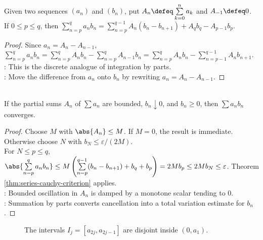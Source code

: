 \begin{theorem} \label{thm:summation-by-parts} \\
Given two sequences $(a_n)$ and $(b_n)$, put $A_n\defeq\sum\limits_{k=0}^{n}a_k$ and $A_{-1}\defeq0$.\\
If $0\leq p\leq q$, then $\sum\limits_{n=p}^{q}a_nb_n=\sum\limits_{n=p}^{q-1}A_n(b_n-b_{n+1})+A_qb_q-A_{p-1}b_p$.
\begin{proof}
Since $a_n=A_n-A_{n-1}$, $\sum\limits_{n=p}^{q}a_nb_n=\sum\limits_{n=p}^{q}A_nb_n-\sum\limits_{n=p}^{q}A_{n-1}b_n =\sum\limits_{n=p}^{q}A_nb_n-\sum\limits_{n=p-1}^{q-1}A_nb_{n+1}$.\\
: This is the discrete analogue of integration by parts.\\
: Move the difference from $a_n$ onto $b_n$ by rewriting $a_n=A_n-A_{n-1}$.
\end{proof}
\end{theorem}

\begin{theorem} \label{thm:dirichlet-test-series} \\
If the partial sums $A_n$ of $\sum a_n$ are bounded, $b_n\downarrow0$, and $b_n\geq0$, then $\sum a_nb_n$ converges.
\begin{proof}
Choose $M$ with $\abs{A_n}\leq M$. If $M=0$, the result is immediate. Otherwise choose $N$ with $b_N\leq\varepsilon/(2M)$.\\
For $N\leq p\leq q$, $\abs{\sum\limits_{n=p}^{q}a_nb_n}\leq M\left(\sum\limits_{n=p}^{q-1}(b_n-b_{n+1})+b_q+b_p\right)=2Mb_p\leq2Mb_N\leq\varepsilon$. Theorem \ref{thm:series-cauchy-criterion} applies.\\
: Bounded oscillation in $A_n$ is damped by a monotone scalar tending to $0$.\\
: Summation by parts converts cancellation into a total variation estimate for $b_n$.
\end{proof}
\end{theorem}

\begin{figure}[H]
  \centering
  
  \caption{The intervals $I_j=[a_{2j},a_{2j-1}]$ are disjoint inside $(0,a_1)$.}
  \label{fig:alternating-series-intervals}
\end{figure}

